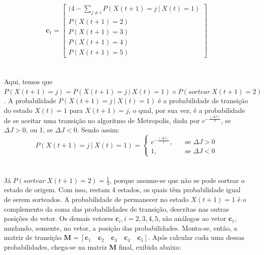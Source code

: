 \documentclass{report}
\begin{document}
\begin{equation*}
\mathbf{c}_1 = \left[\begin{array}{ccc}
						(4 - \sum_{j \neq i} P(X(t+1) = j \ | \ X(t) = 1)\\
						P(X(t+1) = 2)\\
					 	P(X(t+1) = 3)\\
					 	P(X(t+1) = 4)\\ 
					 	P(X(t+1) = 5)
					\end{array}\right]
\end{equation*}\\

\paragraph{} Aqui, temos que $P(X(t+1) = j) = P(X(t+1) = j \ | \ X(t) = 1) \times P(sortear \ X(t+1) = 2)$. A probabilidade $P(X(t+1) = j \ | \ X(t) = 1)$ é a probabilidade de transição do estado $X(t) = 1$ para $X(t+1) = j$, o qual, por sua vez, é a probabilidade de se aceitar uma transição no algoritmo de Metropolis, dada por $e^{- \frac{(\Delta J)}{T}}$, se $\Delta J > 0$, ou 1, se $\Delta J < 0$. Sendo assim:\\

\begin{equation*}
P(X(t+1) = j \ | \ X(t) = 1) = \begin{cases}
									e^{- \frac{(\Delta J)}{T}}, \quad &\text{se } \Delta J > 0\\
									1, \quad &\text{se } \Delta J < 0
							   \end{cases}
\end{equation*}\\

\paragraph{} Já $P(sortear \ X(t+1) = 2) = \frac{1}{4}$, porque assume-se que não se pode sortear o estado de origem. Com isso, restam 4 estados, os quais têm probabilidade igual de serem sorteados. A probabilidade de permanecer no estado $X(t+1) = 1$ é o complemento da soma das probabilidades de transição, descritas nas outras posições do vetor. Os demais vetores $\mathbf{c}_i, i = 2, 3, 4, 5$, são análogos ao vetor $\mathbf{c}_1$, mudando, somente, no vetor, a posição das probabilidades. Monta-se, então, a matriz de transição $\mathbf{M} = [\mathbf{c}_1 \quad \mathbf{c}_2 \quad \mathbf{c}_3 \quad \mathbf{c}_4 \quad \mathbf{c}_5]$. Após calcular cada uma dessas probabilidades, chega-se na matriz $\mathbf{M}$ final, exibida abaixo:\\
\end{document}
